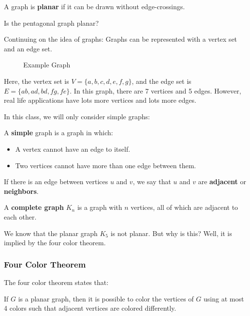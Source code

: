 \documentclass[a4paper]{article}
\begin{document}
\begin{definition}
	A graph is \textbf{planar} if it can be drawn without edge-crossings.
\end{definition}

Is the pentagonal graph planar?


Continuing on the idea of graphs: Graphs can be represented with a vertex set and an edge set.

\begin{figure}[ht]
    \centering
    \caption{Example Graph}
    \label{fig:example-graph}
\end{figure}

Here, the vertex set is \( V=\{a, b, c, d, e, f, g\}   \), and the edge set is \( E = \{ab, ad, bd, fg, fe\}   \). In this graph, there are 7 vertices and 5 edges. However, real life applications have lots more vertices and lots more edges. \par

In this class, we will only consider simple graphs:

\begin{definition}
	A \textbf{simple} graph is a graph in which:
	\begin{itemize}
		\item A vertex cannot have an edge to itself.
		\item Two vertices cannot have more than one edge between them.
	\end{itemize}
\end{definition}

\begin{definition}
	If there is an edge between vertices \( u \) and \( v \), we say that \( u \) and \( v \) are \textbf{adjacent} or \textbf{neighbors}.
\end{definition}

\begin{definition}
	A \textbf{complete graph} \( K_n \) is a graph with \( n \) vertices, all of which are adjacent to each other.
\end{definition}

We know that the planar graph \( K_5 \) is not planar. But why is this? Well, it is implied by the four color theorem.

\subsubsection{Four Color Theorem}
The four color theorem states that:
\begin{theorem}
	If \( G \) is a planar graph, then it is possible to color the vertices of \( G \) using at most 4 colors such that adjacent vertices are colored differently.
\end{theorem}
\end{document}

